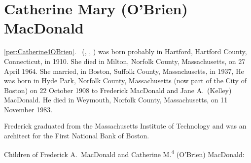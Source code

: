 \section{Catherine Mary (O'Brien) MacDonald}

\ref{per:Catherine4OBrien}.\  (, , ) was born probably in Hartford, Hartford County, Connecticut, in 1910.\cite{Census1910Edward3OBrien,Census1920Edward3OBrien} She died in Milton, Norfolk County, Massachusetts, on 27 April 1964.\cite{Catherine4OBrienDeath} She married, in Boston, Suffolk County, Massachusetts, in 1937, \cite{Catherine4OBrienMarriage} He was born in Hyde Park, Norfolk County, Massachusetts (now part of the City of Boston\cite{HydePark}) on 22 October 1908 to Frederick MacDonald and Jane A.\ (Kelley) MacDonald.\cite{FrederickMacDonaldBirth,FrederickMacDonaldDraft} He died in Weymouth, Norfolk County, Massachusetts, on 11 November 1983.\cite{FrederickMacDonaldDeath}

Frederick graduated from the Massachusetts Institute of Technology and was an architect for the First National Bank of Boston.\cite{FrederickMacDonaldDeath}

\begin{KidsIntro}
	Children of Frederick A.\ MacDonald and Catherine M.\textsuperscript{4} (O'Brien) MacDonald:
\end{KidsIntro}

\begin{Kids}
	
\end{Kids}